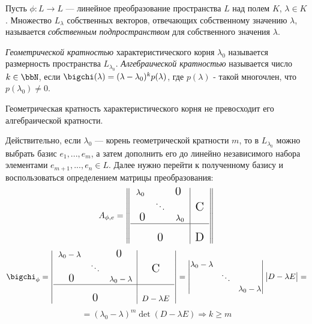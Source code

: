 \begin{defn}
Пусть $\phi:L\rightarrow L$ --- линейное преобразование пространства $L$ над полем $K$, $\lambda \in K$. Множество $L_\lambda$ собственных векторов, отвечающих собственному значению $\lambda$, называется \textit{собственным подпространством} для собственного значения $\lambda$.
\end{defn}
\begin{defn}
\textit{Геометрической кратностью} характеристического корня $\lambda_0$ называется размерность пространства $L_{\lambda_0}$.
\textit{Алгебраической кратностью} называется число $k \in \bbN$, если $\bigchi(\lambda)=(\lambda-\lambda_0)^k p(\lambda)$, где $p(\lambda)$ - такой многочлен, что $p(\lambda_0) \neq 0$.
\end{defn}

\begin{thm}
Геометрическая кратность характеристического корня не превосходит его алгебраической кратности.
\end{thm}
Действительно, если $\lambda_0$ --- корень геометрической кратности $m$, то в $L_{\lambda_0}$ можно выбрать базис $e_1,...,e_m$, а затем дополнить его до линейно независимого набора элементами $e_{m+1},...,e_n \in L$. Далее нужно перейти к полученному базису и воспользоваться определением матрицы преобразования:
\begin{equation*}
A_{\phi,e}=
\begin{Vmatrix}
\begin{tabular}{ccc|c}
  $\lambda_0$ & 			&$\fudge{0 }$& \\
     			& $\ddots$ 	& 			& $\fudge C$ \\
  $\fudge{ 0}$&			& $\lambda_0$ & \\ \hline
     			&  			& 			& \\
     			& $\fudge 0$ 	& 			& $\fudge D$ \\
\end{tabular} 
\end{Vmatrix} 
\end{equation*}
\begin{equation*}
\bigchi_\phi=
\begin{vmatrix}
\begin{tabular}{ccc|c}
  $\lambda_0-\lambda$ & 			&$\fudge{0 }$ 			& \\
     			& $\ddots$ 	& 			& $\fudge C$ \\
  $\fudge{ 0}$&			& $\lambda_0-\lambda$ & \\ \hline
     			&  			& 			& \\
     			& $\fudge 0$ 	& 			& $ D-\lambda E$ \\
\end{tabular} 
\end{vmatrix} = \begin{vmatrix}
    \lambda_0-\lambda & 			& \\
     			& \ddots 	&  \\
     			&  & \lambda_0-\lambda\\ 
\end{vmatrix} \begin{vmatrix}
D-\lambda E
\end{vmatrix}=
\end{equation*}
\begin{equation}
=(\lambda_0-\lambda)^m \det(D-\lambda E) \Rightarrow k \ge m
\end{equation}
